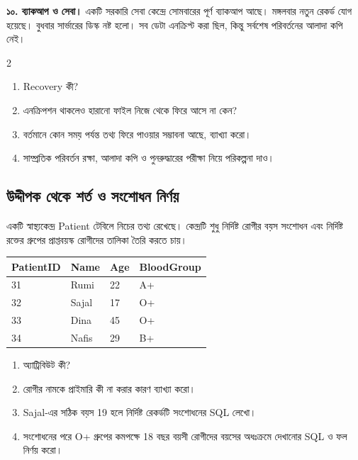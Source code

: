\textbf{১০. ব্যাকআপ ও সেবা।} একটি সরকারি সেবা কেন্দ্রে সোমবারের পূর্ণ ব্যাকআপ আছে। মঙ্গলবার নতুন রেকর্ড যোগ হয়েছে। বুধবার সার্ভারের ডিস্ক নষ্ট হলো। সব ডেটা এনক্রিপ্ট করা ছিল, কিন্তু সর্বশেষ পরিবর্তনের আলাদা কপি নেই।
\begin{multicols}{2}
\begin{enumerate}
\item[ক.] \begin{minipage}[t]{\linewidth}Recovery কী?
\end{minipage}
\item[খ.] \begin{minipage}[t]{\linewidth}এনক্রিপশন থাকলেও হারানো ফাইল নিজে থেকে ফিরে আসে না কেন?
\end{minipage}
\item[গ.] \begin{minipage}[t]{\linewidth}বর্তমানে কোন সময় পর্যন্ত তথ্য ফিরে পাওয়ার সম্ভাবনা আছে, ব্যাখ্যা করো।
\end{minipage}
\item[ঘ.] \begin{minipage}[t]{\linewidth}সাম্প্রতিক পরিবর্তন রক্ষা, আলাদা কপি ও পুনরুদ্ধারের পরীক্ষা নিয়ে পরিকল্পনা দাও।
\end{minipage}
\end{enumerate}
\end{multicols}

\subsection{উদ্দীপক থেকে শর্ত ও সংশোধন নির্ণয়}
একটি স্বাস্থ্যকেন্দ্র Patient টেবিলে নিচের তথ্য রেখেছে। কেন্দ্রটি শুধু নির্দিষ্ট রোগীর বয়স সংশোধন এবং নির্দিষ্ট রক্তের গ্রুপের প্রাপ্তবয়স্ক রোগীদের তালিকা তৈরি করতে চায়।
\begin{flushleft}\small
\begin{tabular}{|l|l|l|l|}\hline
PatientID & Name & Age & BloodGroup\\\hline
31 & Rumi & 22 & A+\\\hline
32 & Sajal & 17 & O+\\\hline
33 & Dina & 45 & O+\\\hline
34 & Nafis & 29 & B+\\\hline
\end{tabular}
\end{flushleft}
\begin{enumerate}
\item[ক.] অ্যাট্রিবিউট কী?
\item[খ.] রোগীর নামকে প্রাইমারি কী না করার কারণ ব্যাখ্যা করো।
\item[গ.] Sajal-এর সঠিক বয়স 19 হলে নির্দিষ্ট রেকর্ডটি সংশোধনের SQL লেখো।
\item[ঘ.] সংশোধনের পরে O+ গ্রুপের কমপক্ষে 18 বছর বয়সী রোগীদের বয়সের অধঃক্রমে দেখানোর SQL ও ফল নির্ণয় করো।
\end{enumerate}


